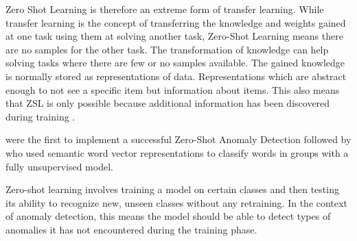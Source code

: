 Zero Shot Learning is therefore an extreme form of transfer learning. While transfer learning is the concept of transferring the knowledge and weights gained at one task using them at solving another task, Zero-Shot Learning means there are no samples for the other task. The transformation of knowledge can help solving tasks where there are few or no samples available. The gained knowledge is normally stored as representations of data. Representations which are abstract enough to not see a specific item but information about items. This also means that ZSL is only possible because additional information has been discovered during training \cite[p. 536]{goodfellow_deep_2016}.

\cite{palatucci_zero-shot_2009} were the first to implement a successful Zero-Shot Anomaly Detection followed by \cite{socher_zero-shot_2013} who used semantic word vector representations to classify words in groups with a fully unsupervised model.

Zero-shot learning involves training a model on certain classes and then testing its ability to recognize new, unseen classes without any retraining. In the context of anomaly detection, this means the model should be able to detect types of anomalies it has not encountered during the training phase.
